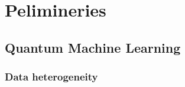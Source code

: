 \begin{comment}
\gangli{Do all of your tenses match up in a paragraph?}

Test citation~\cite{BL12J01}. 
\begin{JournalOnly}
and~\citep{BJL11J01} or~\citet{BJL11J01}.
\end{JournalOnly}

This is for~\cref{tbl:overall-experiments}, 
\todo[fancyline]{Testing.}
and this is for~\cref{sec-conclusions}.
\todo[noline]{A note with no line back to the text.}%
\gangli{This is comment from Gang.}
\qwu{Response from QW}

Number:
\num{123}.
\numlist{10;30;50;70},
\numrange{10}{30},
\SIlist{10;30;45}{\metre},
and
\SI{10}{\percent}

\missingfigure[figcolor=white]{Testing figcolor}


\begin{ConferenceOnly}
We have \SI{10}{\hertz},
\si{\kilogram\metre\per\second},
the range: \SIrange{10}{100}{\hertz}.
$\nicefrac[]{1}{2}$.

\missingfigure{Make a sketch of the structure of a trebuchet.}

\end{ConferenceOnly}


For~\cref{eq:test},
as shown below:

\begin{equation}\label{eq:test}
a = b \times \sqrt{ab}
\end{equation}

\blindmathpaper

\section{Preliminaries} \label{sec-preliminaries}

\blindtext

\gliMarker  %

\end{comment}
\section{Pelimineries} \label{sec-method}

\subsection{Quantum Machine Learning}

\subsubsection{Data heterogeneity}

